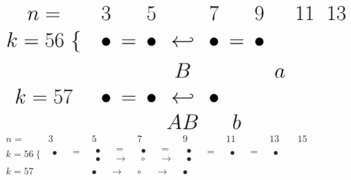 \documentclass{article}
\begin{document}
\(
\begin{tikzcd}[nodes={font=\Huge},row sep=0.2cm,column sep=0.1cm]
n= & & 3 & & 5 & & 7 & & 9 & & 11 & & 13 \\
k=56 \ \{ & & \bullet & = & \bullet & \hookleftarrow & \bullet & = & \bullet \\
& {} & {} & {} & {} & B & {}  & {}  & {} & a \\
k=57 & {} & \bullet & = & \bullet & \hookleftarrow & \bullet \\
 & {}  & {}  & {}  & {} & AB & {} & b 
\end{tikzcd}
\) \\
\(
\begin{array}{lcccccccccccccccccccc}
n= & 3 & & 5 & & 7 & & 9 & & 11 & & 13 & & 15 \\
k=56 \ \{ & \substack{\bullet\\ {}} & \substack{=\\ {}} & \substack{\bullet\\ \bullet} & \substack{=\\ \rightarrow} & \substack{\bullet\\ \circ} & \substack{=\\ \rightarrow} & \substack{\bullet\\ \bullet} & \substack{=\\ {}} & \substack{\bullet\\ {}} & \substack{=\\ {}} & \substack{\bullet\\ {}} \\
k=57 & & & \bullet & \rightarrow & \circ & \rightarrow & \bullet
\end{array}
\)
\end{document}
